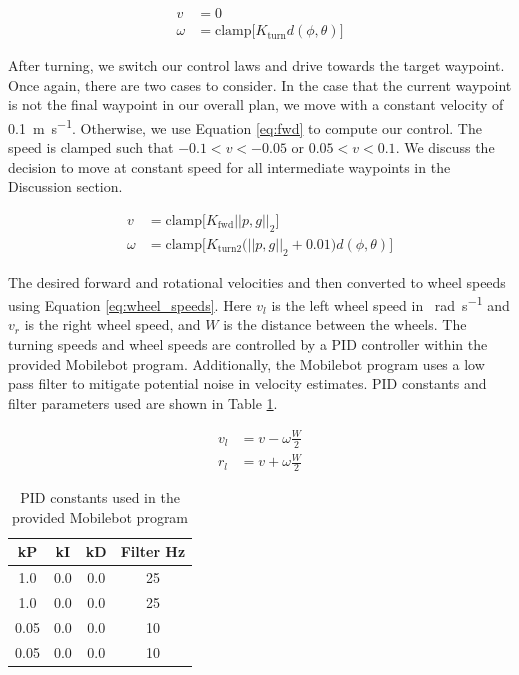 \documentclass[journal]{IEEEtran}
\begin{document}
\begin{equation} \label{eq:turn}
    \begin{split}
     v &= 0 \\
     \omega &= \text{clamp}\Big[K_\text{turn}d(\phi,\theta)\Big]
    \end{split}
\end{equation}

After turning, we switch our control laws and drive towards the target waypoint. Once again, there are two cases to consider. In the case that the current waypoint is not the final waypoint in our overall plan, we move with a constant velocity of \SI{0.1}{\meter\per\second}. Otherwise, we use Equation \eqref{eq:fwd} to compute our control. The speed is clamped such that $-0.1 < v < -0.05$ or $0.05 < v < 0.1$. We discuss the decision to move at constant speed for all intermediate waypoints in the Discussion section.

\begin{equation} \label{eq:fwd}
    \begin{split}
     v &=  \text{clamp}\Big[K_\text{fwd}||p, g||_2\Big] \\
     \omega &= \text{clamp}\Big[K_\text{turn2}\big(||p, g||_2+0.01\big)d(\phi,\theta)\Big]
    \end{split}
\end{equation}

The desired forward and rotational velocities and then converted to wheel speeds using Equation \eqref{eq:wheel_speeds}. Here $v_l$ is the left wheel speed in \SI{}{\radian\per\second} and $v_r$ is the right wheel speed, and $W$ is the distance between the wheels. The turning speeds and wheel speeds are controlled by a PID controller within the provided Mobilebot program. Additionally, the Mobilebot program uses a low pass filter to mitigate potential noise in velocity estimates. PID constants and filter parameters used are shown in Table \ref{tab:pid}.

\begin{equation} \label{eq:wheel_speeds}
    \begin{split}
        v_l &= v - \omega\frac{W}{2} \\
        r_l &= v + \omega\frac{W}{2}
    \end{split}
\end{equation}

\begin{table}[b!]
    \centering
    \begin{tabular}{|c|c|c|c|} \hline
        kP & kI & kD & Filter Hz \\ \hline
        1.0 & 0.0 & 0.0 & 25 \\ \hline
        1.0 & 0.0 & 0.0 & 25 \\ \hline
        0.05 & 0.0 & 0.0 & 10 \\ \hline
        0.05 & 0.0 & 0.0 & 10 \\ \hline
    \end{tabular}
    \caption{PID constants used in the provided Mobilebot program}
    \label{tab:pid}
\end{table}
\end{document}
